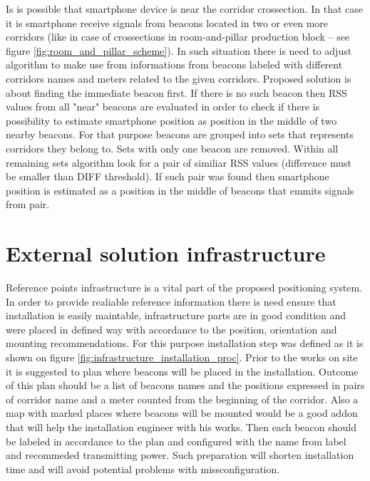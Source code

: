 \documentclass[../main.tex]{subfiles}
\begin{document}
Is is possible that smartphone device is near the corridor crossection. In that case it is smartphone receive signals from beacons located in two or even more corridors (like in case of crossections in room-and-pillar production block -- see figure \ref{fig:room_and_pillar_scheme}). In such situation there is need to adjust algorithm to make use from informations from beacons labeled with different corridors names and meters related to the given corridors. Proposed solution is about finding the immediate beacon first. If there is no such beacon then RSS values from all "near" beacons are evaluated in order to check if there is possibility to estimate smartphone position as position in the middle of two nearby beacons. For that purpose beacons are grouped into sets that represents corridors they belong to. Sets with only one beacon are removed. Within all remaining sets algorithm look for a pair of similiar RSS values (difference must be smaller than DIFF threshold). If such pair was found then smartphone position is estimated as a position in the middle of beacons that emmits signals from pair.


\section{External solution infrastructure} %
\label{sec:external_solution_infrastructure}

Reference points infrastructure is a vital part of the proposed positioning system. In order to provide realiable reference information there is need ensure that installation is easily maintable, infrastructure parts are in good condition and were placed in defined way with accordance to the position, orientation and mounting recommendations. For this purpose installation step was defined as it is shown on figure \ref{fig:infrastructure_installation_proc}. Prior to the works on site it is suggested to plan where beacons will be placed in the installation. Outcome of this plan should be a list of beacons names and the positions expressed in pairs of corridor name and a meter counted from the beginning of the corridor. Also a map with marked places where beacons will be mounted would be a good addon that will help the installation engineer with his works. Then each beacon should be labeled in accordance to the plan and configured with the name from label and recommeded transmitting power. Such preparation will shorten installation time and will avoid potential problems with missconfiguration.
\end{document}

